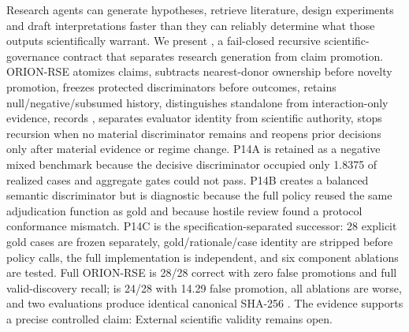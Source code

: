 \markdownRendererDocumentBegin
Research agents can generate hypotheses, retrieve literature, design experiments and draft interpretations faster than they can reliably determine what those outputs scientifically warrant. We present , a fail-closed recursive scientific-governance contract that separates research generation from claim promotion. ORION-RSE atomizes claims, subtracts nearest-donor ownership before novelty promotion, freezes protected discriminators before outcomes, retains null/negative/subsumed history, distinguishes standalone from interaction-only evidence, records , separates evaluator identity from scientific authority, stops recursion when no material discriminator remains and reopens prior decisions only after material evidence or regime change. P14A is retained as a negative mixed benchmark because the decisive discriminator occupied only 1.8375\markdownRendererPercentSign{} of realized cases and aggregate gates could not pass. P14B creates a balanced semantic discriminator but is diagnostic because the full policy reused the same adjudication function as gold and because hostile review found a protocol conformance mismatch. P14C is the specification-separated successor: 28 explicit gold cases are frozen separately, gold/rationale/case identity are stripped before policy calls, the full implementation is independent, and six component ablations are tested. Full ORION-RSE is 28/28 correct with zero false promotions and full valid-discovery recall;  is 24/28 with 14.29\markdownRendererPercentSign{} false promotion, all ablations are worse, and two evaluations produce identical canonical SHA-256 . The evidence supports a precise controlled claim:  External scientific validity remains open.\markdownRendererDocumentEnd
